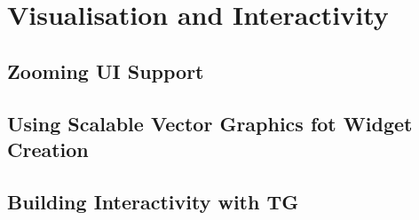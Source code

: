 \chapter{Visualisation and Interactivity}\label{ch:07}

\section{Zooming UI Support}

\section{Using Scalable Vector Graphics fot Widget Creation}

\section{Building Interactivity with TG}